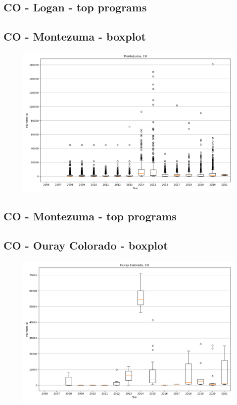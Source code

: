 \subsection*{CO - Logan - top programs}

\newpage
\subsection*{CO - Montezuma - boxplot}
\begin{figure}[h]
\centering
\includegraphics[width=7in]{../output/boxplots/counties/Montezuma-CO_boxplot.png}
\end{figure}


\subsection*{CO - Montezuma - top programs}

\newpage
\subsection*{CO - Ouray Colorado - boxplot}
\begin{figure}[h]
\centering
\includegraphics[width=7in]{../output/boxplots/counties/Ouray Colorado-CO_boxplot.png}
\end{figure}


